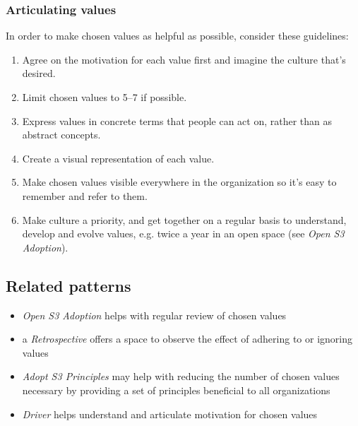 \subsubsection{Articulating values}
\label{articulatingvalues}

In order to make chosen values as helpful as possible, consider these guidelines:

\begin{enumerate}
\item Agree on the motivation for each value first and imagine the culture that's desired.

\item Limit chosen values to 5--7 if possible.

\item Express values in concrete terms that people can act on, rather than as abstract concepts.

\item Create a visual representation of each value.

\item Make chosen values visible everywhere in the organization so it's easy to remember and refer to them.

\item Make culture a priority, and get together on a regular basis to understand, develop and evolve values, e.g. twice a year in an open space (see \emph{Open S3 Adoption}).

\end{enumerate}

\subsection{Related patterns}
\label{relatedpatterns}

\begin{itemize}
\item \emph{Open S3 Adoption} helps with regular review of chosen values

\item a \emph{Retrospective} offers a space to observe the effect of adhering to or ignoring values

\item \emph{Adopt S3 Principles} may help with reducing the number of chosen values necessary by providing a set of principles beneficial to all organizations

\item \emph{Driver} helps understand and articulate motivation for chosen values

\end{itemize}

